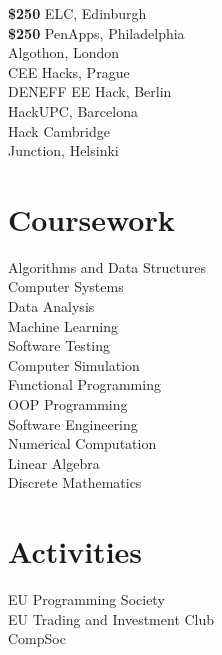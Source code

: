 \documentclass{article}
\begin{document}
\begin{minipage}[t]{0.33\textwidth}
\textbf{\$250 } ELC, Edinburgh \\
\textbf{\$250 } PenApps, Philadelphia \\
\textbf{ } Algothon, London \\
\textbf{ } CEE Hacks, Prague\\
\textbf{ } DENEFF EE Hack, Berlin\\
\textbf{ } HackUPC, Barcelona\\
\textbf{  } Hack Cambridge \\
\textbf{    } Junction, Helsinki


\section{Coursework}
Algorithms and Data Structures \\
Computer Systems \\
Data Analysis \\
Machine Learning \\
Software Testing \\
Computer Simulation \\
Functional Programming \\
OOP Programming \\
Software Engineering \\
Numerical Computation \\
Linear Algebra \\
Discrete Mathematics 


\section{Activities}
EU Programming Society \\
EU Trading and Investment Club \\
CompSoc \\

\end{minipage}%
\end{document}
